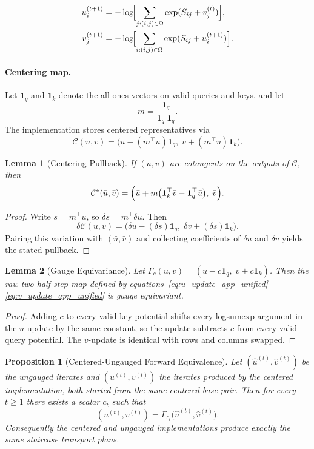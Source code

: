 \documentclass{article}
\newtheorem{proposition}{Proposition}
\newtheorem{lemma}{Lemma}
\begin{document}
\begin{align}
    u_i^{(t+1)} &= -\log\!\Bigl[\sum_{j:(i,j)\in\Omega} \exp(S_{ij} + v_j^{(t)})\Bigr], \label{eq:u_update_app_unified}\\
    v_j^{(t+1)} &= -\log\!\Bigl[\sum_{i:(i,j)\in\Omega} \exp(S_{ij} + u_i^{(t+1)})\Bigr]. \label{eq:v_update_app_unified}
\end{align}

\paragraph{Centering map.}
Let $\mathbf{1}_q$ and $\mathbf{1}_k$ denote the all-ones vectors on valid queries and keys, and let
\[
m = \frac{\mathbf{1}_q}{\mathbf{1}_q^\top\mathbf{1}_q}.
\]
The implementation stores centered representatives via
\[
\mathcal{C}(u,v)=\bigl(u-(m^\top u)\mathbf{1}_q,\; v+(m^\top u)\mathbf{1}_k\bigr).
\]

\begin{lemma}[Centering Pullback]
If $(\bar u,\bar v)$ are cotangents on the outputs of $\mathcal{C}$, then
\[
\mathcal{C}^*(\bar u,\bar v)
=
\Bigl(
\bar u + m\bigl(\mathbf{1}_k^\top \bar v - \mathbf{1}_q^\top \bar u\bigr),
\;
\bar v
\Bigr).
\]
\end{lemma}

\begin{proof}
Write $s=m^\top u$, so $\delta s = m^\top \delta u$. Then
\[
\delta \mathcal{C}(u,v)
=
\bigl(\delta u-(\delta s)\mathbf{1}_q,\; \delta v+(\delta s)\mathbf{1}_k\bigr).
\]
Pairing this variation with $(\bar u,\bar v)$ and collecting coefficients of $\delta u$ and $\delta v$ yields the stated pullback.
\end{proof}

\begin{lemma}[Gauge Equivariance]
Let $\Gamma_c(u,v)=(u-c\mathbf{1}_q,\; v+c\mathbf{1}_k)$. Then the raw two-half-step map defined by equations~\eqref{eq:u_update_app_unified}--\eqref{eq:v_update_app_unified} is gauge equivariant.
\end{lemma}

\begin{proof}
Adding $c$ to every valid key potential shifts every logsumexp argument in the $u$-update by the same constant, so the update subtracts $c$ from every valid query potential. The $v$-update is identical with rows and columns swapped.
\end{proof}

\begin{proposition}[Centered-Ungauged Forward Equivalence]
Let $(\widehat u^{(t)},\widehat v^{(t)})$ be the ungauged iterates and $(u^{(t)},v^{(t)})$ the iterates produced by the centered implementation, both started from the same centered base pair. Then for every $t\ge 1$ there exists a scalar $c_t$ such that
\[
(u^{(t)},v^{(t)})=\Gamma_{c_t}\bigl(\widehat u^{(t)},\widehat v^{(t)}\bigr).
\]
Consequently the centered and ungauged implementations produce exactly the same staircase transport plans.
\end{proposition}
\end{document}
